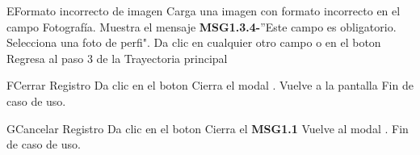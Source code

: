 \begin{UCtrayectoriaA}{E}{Formato incorrecto de imagen}
	\UCpaso[\UCactor] Carga una imagen con formato incorrecto en el campo Fotografía.
	\UCpaso Muestra el mensaje {\bf MSG1.3.4-}''Este campo es obligatorio. Selecciona una foto de perfi".
	\UCpaso[\UCactor] Da clic en cualquier otro campo o en el boton 
	\UCpaso Regresa al paso 3 de la Trayectoria principal
\end{UCtrayectoriaA}

\begin{UCtrayectoriaA}{F}{Cerrar Registro}
	\UCpaso[\UCactor] Da clic en el boton 
	\UCpaso Cierra el modal .
	\UCpaso Vuelve a la pantalla 
	\UCpaso Fin de caso de uso.
\end{UCtrayectoriaA}

\begin{UCtrayectoriaA}{G}{Cancelar Registro}
	\UCpaso[\UCactor] Da clic en el boton 
	\UCpaso Cierra el  {\bf MSG1.1}
	\UCpaso Vuelve al  modal .
	\UCpaso Fin de caso de uso.
\end{UCtrayectoriaA}
